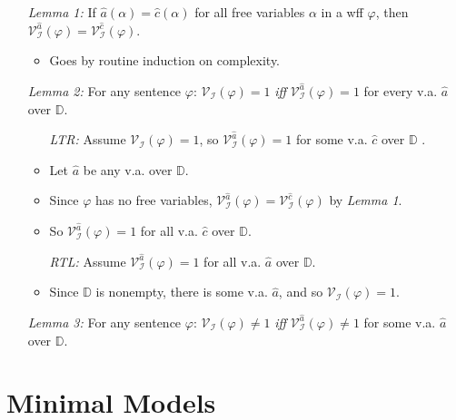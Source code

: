 \documentclass[a4paper, 11pt]{article} %
\newcommand{\I}{\mathcal{I}}
\newcommand{\D}{\mathbb{D}}
\newcommand{\VV}[2]{\mathcal{V}_{#1}^{#2}} %
\begin{document}
\begin{enumerate}
  \item[\it Lemma 1:] If $\hat{a}(\alpha)=\hat{c}(\alpha)$ for all free variables $\alpha$ in a wff $\varphi$, then $\VV{\I}{\hat{a}}(\varphi)=\VV{\I}{\hat{c}}(\varphi)$.
    \begin{itemize}
      \item Goes by routine induction on complexity.
    \end{itemize}
  \item[\it Lemma 2:] For any sentence $\varphi$: $\VV{\I}{}(\varphi)= 1$ \textit{iff} $\VV{\I}{\hat{a}}(\varphi)= 1$ for every v.a. $\hat{a}$ over $\D$.
    \begin{itemize}
      \item[\it LTR:] Assume $\VV{\I}{}(\varphi)= 1$, so $\VV{\I}{\hat{a}}(\varphi)= 1$ for some v.a. $\hat{c}$ over $\D$ .
      \item Let $\hat{a}$ be any v.a. over $\D$.
      \item Since $\varphi$ has no free variables, $\VV{\I}{\hat{a}}(\varphi)=\VV{\I}{\hat{c}}(\varphi)$ by \textit{Lemma 1}.
      \item So $\VV{\I}{\hat{a}}(\varphi)=1$ for all v.a. $\hat{c}$ over $\D$.
      \item[\it RTL:] Assume $\VV{\I}{\hat{a}}(\varphi)=1$ for all v.a. $\hat{a}$ over $\D$.
      \item Since $\D$ is nonempty, there is some v.a. $\hat{a}$, and so $\VV{\I}{}(\varphi)= 1$. 
    \end{itemize}
  \item[\it Lemma 3:] For any sentence $\varphi$: $\VV{\I}{}(\varphi)\neq1$ \textit{iff} $\VV{\I}{\hat{a}}(\varphi)\neq 1$ for some v.a. $\hat{a}$ over $\D$.
\end{enumerate}



\section*{Minimal Models}
\end{document}
